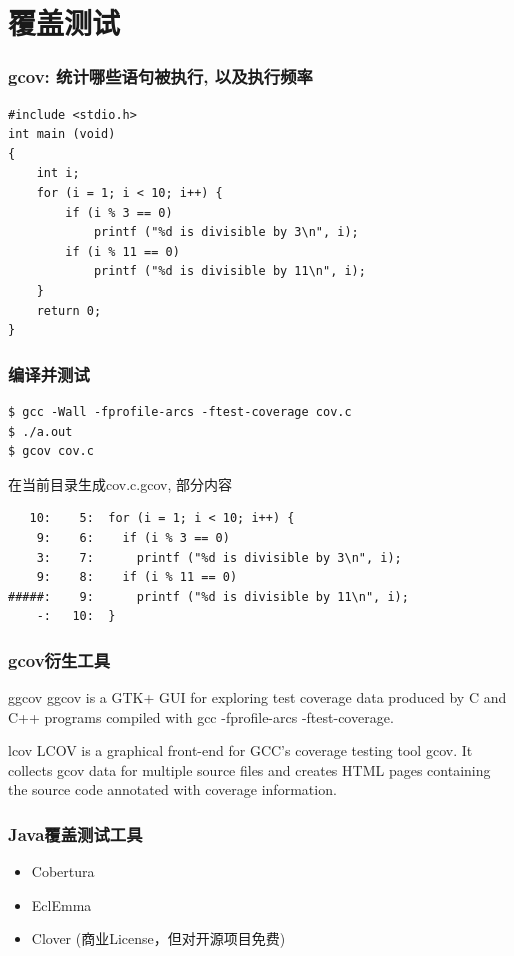 \documentclass[compress]{beamer}
\begin{document}
\section{覆盖测试}

\begin{frame}[fragile]
\frametitle{gcov: 统计哪些语句被执行, 以及执行频率}
\begin{lstlisting}
#include <stdio.h>
int main (void)
{
    int i;
    for (i = 1; i < 10; i++) {
        if (i % 3 == 0)
            printf ("%d is divisible by 3\n", i);
        if (i % 11 == 0)
            printf ("%d is divisible by 11\n", i);
    }
    return 0;
}
\end{lstlisting}
\end{frame}

\begin{frame}[fragile]
\frametitle{编译并测试}

{\small
\begin{Verbatim}
$ gcc -Wall -fprofile-arcs -ftest-coverage cov.c
$ ./a.out
$ gcov cov.c
\end{Verbatim}
}

在当前目录生成cov.c.gcov, 部分内容
{\small
\begin{Verbatim}
   10:    5:  for (i = 1; i < 10; i++) {
    9:    6:    if (i % 3 == 0)
    3:    7:      printf ("%d is divisible by 3\n", i);
    9:    8:    if (i % 11 == 0)
#####:    9:      printf ("%d is divisible by 11\n", i);
    -:   10:  }
\end{Verbatim}
}

\end{frame}

\begin{frame}
	\frametitle{gcov衍生工具}
	\begin{block}{ggcov}
	ggcov is a GTK+ GUI for exploring test coverage data produced by C and C++ programs compiled with gcc -fprofile-arcs -ftest-coverage. 
	\end{block}
	\begin{block}{lcov}
		LCOV is a graphical front-end for GCC's coverage testing tool gcov. It collects gcov data for multiple source files and creates HTML pages containing the source code annotated with coverage information.
	\end{block}
\end{frame}

\begin{frame}
	\frametitle{Java覆盖测试工具}
	\begin{itemize}
		\item Cobertura
		\item EclEmma
		\item Clover (商业License，但对开源项目免费)
	\end{itemize}
\end{frame}
\end{document}
